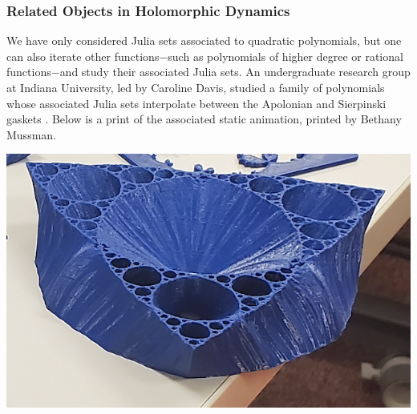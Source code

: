 \documentclass[12 pt]{article}
\begin{document}
\subsubsection{Related Objects in Holomorphic Dynamics}\label{CarolineUndergrad}
    We have only considered Julia sets associated to quadratic polynomials, but one can also iterate other functions$-$such as polynomials of higher degree or rational functions$-$and study their associated Julia sets.  An undergraduate research group at Indiana University, led by Caroline Davis, studied a family of polynomials whose associated Julia sets interpolate between the Apolonian and Sierpinski gaskets \cite{log(iu)}.  Below is a print of the associated static animation, printed by Bethany Mussman.
    \begin{center}
    \includegraphics[width=.6\paperwidth]{images/caroline1.png}
    \end{center}
\end{document}
